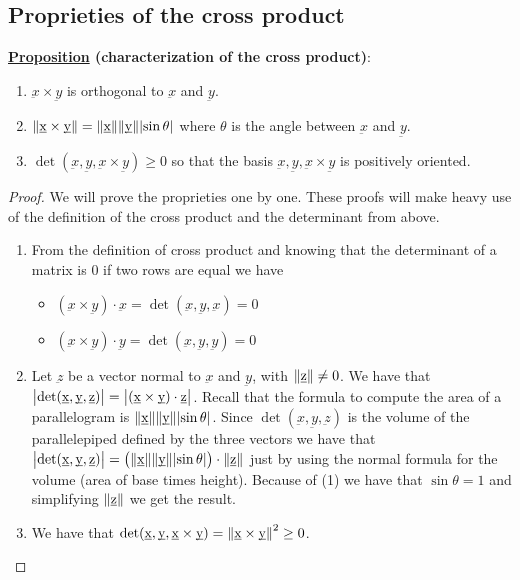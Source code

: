 \documentclass[10pt]{extarticle}
\begin{document}
\subsection{Proprieties of the cross product}

\textbf{\underline{Proposition} (characterization of the cross product)}:

\begin{enumerate}
    \item $\underbar{x} \times \underbar{y}$ is orthogonal to $\underbar{x}$ and $\underbar{y}$.
    \item $\norm{\underbar{x} \times \underbar{y}} = \norm{\underbar{x}} \norm {\underbar{y}} \abs{\sin \theta}$
          where $\theta$ is the angle between $\underbar{x}$ and $\underbar{y}$.
    \item $\det (\underbar{x}, \underbar{y}, \underbar{x} \times \underbar{y}) \geq 0$
          so that the basis $\underbar{x}, \underbar{y}, \underbar{x} \times \underbar{y}$ is positively oriented.
\end{enumerate}

\begin{proof}
    We will prove the proprieties one by one.
    These proofs will make heavy use of the definition of the cross product and the determinant from above.
    \begin{enumerate}
        \item From the definition of cross product and knowing that the determinant of a matrix is 0 if two rows are equal we have
              \begin{itemize}
                  \item $(\underbar{x} \times \underbar{y}) \cdot \underbar{x} = \det (\underbar{x}, \underbar{y}, \underbar{x}) = 0$
                  \item $(\underbar{x} \times \underbar{y}) \cdot \underbar{y} = \det (\underbar{x}, \underbar{y}, \underbar{y}) = 0$
              \end{itemize}
        \item Let $\underbar{z}$ be a vector normal to $\underbar{x}$ and $\underbar{y}$, with $\norm{\underbar{z}} \ne 0$.
              We have that $\abs{\det (\underbar{x}, \underbar{y}, \underbar{z})} = \abs{(\underbar{x} \times \underbar{y}) \cdot \underbar{z}}$.
              Recall that the formula to compute the area of a parallelogram is $\norm{\underbar{x}} \norm{\underbar{y}} \abs{\sin \theta}$.
              Since $\det (\underbar{x}, \underbar{y}, \underbar{z})$ is the volume of the parallelepiped defined by the three vectors we have that
              $\abs{\det (\underbar{x}, \underbar{y}, \underbar{z})} = \left(\norm{\underbar{x}} \norm{\underbar{y}} \abs{\sin \theta}\right) \cdot \norm{\underbar{z}}$ just by using the normal formula for the volume (area of base times height).
              Because of (1) we have that $\sin \theta = 1$ and simplifying $\norm{\underbar{z}}$ we get the result.
        \item We have that $\det (\underbar{x}, \underbar{y}, \underbar{x} \times \underbar{y}) = \norm{\underbar{x} \times \underbar{y}}^2 \geq 0$.
    \end{enumerate}
\end{proof}
\end{document}
